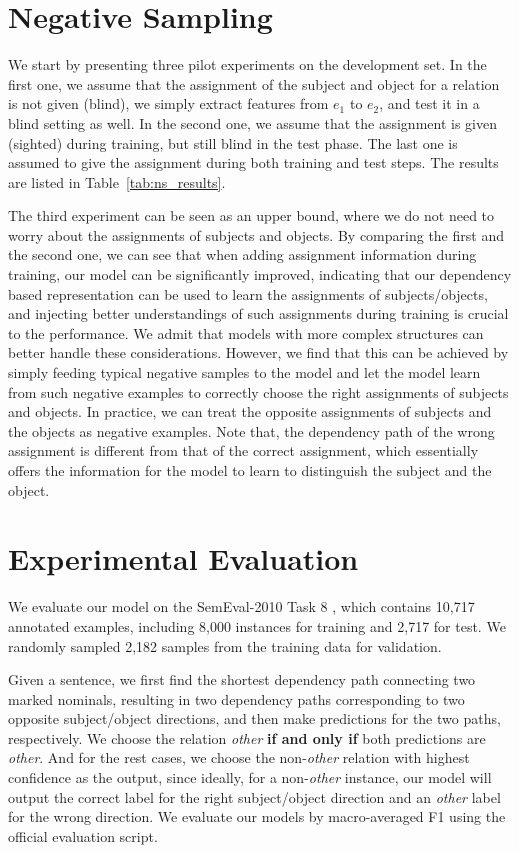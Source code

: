 \documentclass[11pt,a4paper]{article}
\begin{document}
\section{Negative Sampling}
\label{sec:ns}
We start by presenting three pilot experiments on the development set. In the first one, we assume that the assignment of the subject and object for a relation is not given (blind), we simply extract features from $e_1$ to $e_2$, and test it in a blind setting as well. In the second one, we assume that the assignment is given (sighted) during training, but still blind in the test phase. The last one is assumed to give the assignment during both  training and test steps. The results are listed in Table~\ref{tab:ns_results}.

The third experiment can be seen as an upper bound, where we do not need to worry about the assignments 
of subjects and objects. By comparing the first and the second one, we can see that when adding 
assignment information during training, our model can be significantly improved, indicating that our dependency based representation can be used to  learn the assignments of subjects/objects, and injecting
 better understandings of such assignments during training is crucial to the performance. 
We admit that models with more complex structures can better handle these considerations. 
However, we find that this can be achieved by simply feeding typical negative samples to the model 
and let the model learn from such negative examples to correctly choose the right assignments of subjects and objects. 
In practice, we can treat the opposite assignments of subjects and the objects as negative examples. 
Note that, the dependency path of the wrong assignment is different from that of the correct assignment, which essentially offers the information for the model to learn to distinguish the subject and the object. 







\section{Experimental Evaluation}
We evaluate our model on the SemEval-2010 Task 8 \cite{hendrickx}, which contains 10,717 annotated examples, including 8,000 instances for training and 2,717 for test. We randomly sampled 2,182 samples from the training data for validation.

Given a sentence, we first find the shortest dependency path connecting two marked nominals, resulting in two dependency paths corresponding to two opposite subject/object directions, and then make predictions for the two paths, respectively. 
We choose the relation \textit{other} \textbf{if and only if} both predictions are \textit{other}. And for the rest cases, 
we choose the non-\textit{other} relation with highest confidence as the output, since ideally, for a non-\textit{other} instance, 
our model will output the correct label for the right  subject/object direction and an   \textit{other}  label for the wrong direction.
We evaluate our models by macro-averaged F1 using the official evaluation script.
\end{document}
